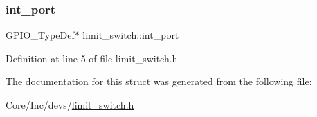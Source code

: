 \subsubsection{\texorpdfstring{int\_port}{int\_port}}
{\footnotesize\ttfamily G\+P\+I\+O\+\_\+\+Type\+Def$\ast$ limit\+\_\+switch\+::int\+\_\+port}



Definition at line 5 of file limit\+\_\+switch.\+h.



The documentation for this struct was generated from the following file\+:\begin{DoxyCompactItemize}
\item 
Core/\+Inc/devs/\mbox{\hyperlink{limit__switch_8h}{limit\+\_\+switch.\+h}}\end{DoxyCompactItemize}
